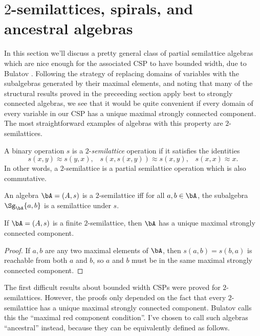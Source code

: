 \section{$2$-semilattices, spirals, and ancestral algebras}

In this section we'll discuss a pretty general class of partial semilattice algebras which are nice enough for the associated CSP to have bounded width, due to Bulatov \cite{colored-graph-prelim}. Following the strategy of replacing domains of variables with the subalgebras generated by their maximal elements, and noting that many of the structural results proved in the preceeding section apply best to strongly connected algebras, we see that it would be quite convenient if every domain of every variable in our CSP has a unique maximal strongly connected component. The most straightforward examples of algebras with this property are $2$-semilattices.

\begin{defn} A binary operation $s$ is a $2$-\emph{semilattice} operation if it satisfies the identities
\[
s(x,y) \approx s(y,x), \;\;\; s(x,s(x,y)) \approx s(x,y), \;\;\; s(x,x) \approx x.
\]
In other words, a $2$-semilattice is a partial semilattice operation which is also commutative.
\end{defn}

\begin{prop} An algebra $\bA = (A,s)$ is a $2$-semilattice iff for all $a,b \in \bA$, the subalgebra $\Sg_{\bA}\{a,b\}$ is a semilattice under $s$.
\end{prop}

\begin{prop} If $\bA = (A,s)$ is a finite $2$-semilattice, then $\bA$ has a unique maximal strongly connected component.
\end{prop}
\begin{proof} If $a, b$ are any two maximal elements of $\bA$, then $s(a,b) = s(b,a)$ is reachable from both $a$ and $b$, so $a$ and $b$ must be in the same maximal strongly connected component.
\end{proof}

The first difficult results about bounded width CSPs were proved for $2$-semilattices. However, the proofs only depended on the fact that every $2$-semilattice has a unique maximal strongly connected component. Bulatov \cite{colored-graph-prelim} calls this the ``maximal red component condition''. I've chosen to call such algebras ``ancestral'' instead, because they can be equivalently defined as follows.

